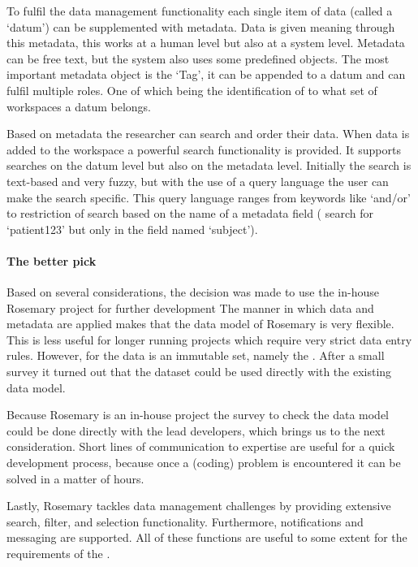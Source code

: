 To fulfil the data management functionality each single item of data (called a `datum') can be supplemented with metadata.
Data is given meaning through this metadata, this works at a human level but also at a system level.
Metadata can be free text, but the system also uses some predefined objects.
The most important metadata object is the `Tag', it can be appended to a datum and can fulfil multiple roles. 
One of which being the identification of to what set of workspaces a datum belongs.

Based on metadata the researcher can search and order their data.
When data is added to the workspace a powerful search functionality is provided.
It supports searches on the datum level but also on the metadata level.
Initially the search is text-based and very fuzzy, but with the use of a query language the user can make the search specific.
This query language ranges from keywords like `and/or' to restriction of search based on the name of a metadata field (\eg{} search for `patient123' but only in the field named `subject').

\paragraph{The better pick}
Based on several considerations, the decision was made to use the in-house Rosemary project for further development
The manner in which data and metadata are applied makes that the data model of Rosemary is very flexible.
This is less useful for longer running projects which require very strict data entry rules.
However, for the \ivfsystem{} data is an immutable set, namely the \projectdata{}.
After a small survey it turned out that the dataset could be used directly with the existing data model.

Because Rosemary is an in-house project the survey to check the data model could be done directly with the lead developers, which brings us to the next consideration.
Short lines of communication to expertise are useful for a quick development process, because once a (coding) problem is encountered it can be solved in a matter of hours.

Lastly, Rosemary tackles data management challenges by providing extensive search, filter, and selection functionality.
Furthermore, notifications and messaging are supported.
All of these functions are useful to some extent for the requirements of the \ivfsystem{}.